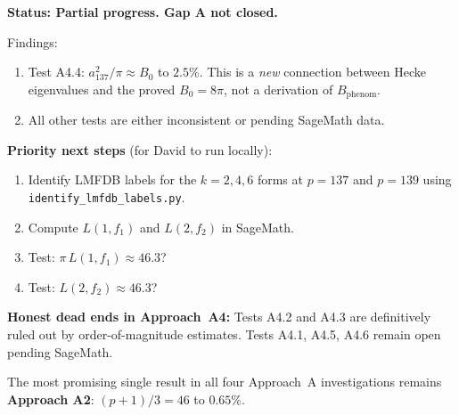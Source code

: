 \documentclass[12pt,a4paper]{article}
\theoremstyle{definition}
\theoremstyle{remark}
\begin{document}
\begin{gapbox}
\textbf{Status: Partial progress.  Gap A not closed.}

Findings:
\begin{enumerate}
  \item Test A4.4: $a_{137}^2/\pi \approx B_0$ to $2.5\%$.
        This is a \emph{new} connection between Hecke eigenvalues and the
        proved $B_0 = 8\pi$, not a derivation of $B_{\mathrm{phenom}}$.
  \item All other tests are either inconsistent or pending SageMath data.
\end{enumerate}

\textbf{Priority next steps} (for David to run locally):
\begin{enumerate}
  \item Identify LMFDB labels for the $k=2,4,6$ forms at $p=137$ and $p=139$
        using \texttt{identify\_lmfdb\_labels.py}.
  \item Compute $L(1, f_1)$ and $L(2, f_2)$ in SageMath.
  \item Test: $\pi\,L(1,f_1) \approx 46.3$?
  \item Test: $L(2,f_2) \approx 46.3$?
\end{enumerate}

\textbf{Honest dead ends in Approach~A4:}
Tests A4.2 and A4.3 are definitively ruled out by order-of-magnitude
estimates.  Tests A4.1, A4.5, A4.6 remain open pending SageMath.

The most promising single result in all four Approach~A investigations
remains \textbf{Approach A2}: $(p+1)/3 = 46$ to $0.65\%$.
\end{gapbox}

\ifdefined\INCLUDEMODE
\else
  
\end{document}
